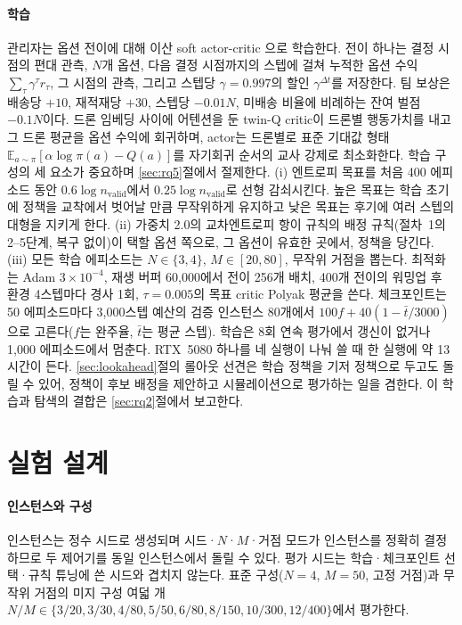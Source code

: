 \documentclass[final,5p,times,twocolumn]{elsarticle}
\begin{document}
\paragraph{학습}
관리자는 옵션 전이에 대해 이산 soft actor-critic \cite{haarnoja2018}으로 학습한다. 전이 하나는
결정 시점의 편대 관측, $N$개 옵션, 다음 결정 시점까지의 스텝에 걸쳐 누적한 옵션 수익
$\sum_{\tau} \gamma^{\tau} r_{\tau}$, 그 시점의 관측, 그리고 스텝당 $\gamma = 0.997$의 할인
$\gamma^{\Delta t}$를 저장한다. 팀 보상은 배송당 $+10$, 재적재당 $+30$, 스텝당 $-0.01N$, 미배송
비율에 비례하는 잔여 벌점 $-0.1N$이다. 드론 임베딩 사이에 어텐션을 둔 twin-Q critic이 드론별
행동가치를 내고 그 드론 평균을 옵션 수익에 회귀하며, actor는 드론별로 표준 기대값 형태
$\mathbb{E}_{a \sim \pi}[\alpha \log \pi(a) - Q(a)]$를 자기회귀 순서의 교사 강제로 최소화한다.
학습 구성의 세 요소가 중요하며 \ref{sec:rq5}절에서 절제한다. (i) 엔트로피 목표를 처음 400 에피소드
동안 $0.6 \log n_{\mathrm{valid}}$에서 $0.25 \log n_{\mathrm{valid}}$로 선형 감쇠시킨다. 높은
목표는 학습 초기에 정책을 교착에서 벗어날 만큼 무작위하게 유지하고 낮은 목표는 후기에 여러 스텝의
대형을 지키게 한다. (ii) 가중치 2.0의 교차엔트로피 항이 규칙의 배정 규칙(절차~1의 2--5단계,
복구 없이)이 택할 옵션 쪽으로, 그 옵션이 유효한 곳에서, 정책을 당긴다. (iii) 모든 학습
에피소드는 $N \in \{3,4\}$, $M \in [20,80]$, 무작위 거점을 뽑는다. 최적화는 Adam
$3 \times 10^{-4}$, 재생 버퍼 60{,}000에서 전이 256개 배치, 400개 전이의 워밍업 후 환경 4스텝마다
경사 1회, $\tau = 0.005$의 목표 critic Polyak 평균을 쓴다. 체크포인트는 50 에피소드마다
3{,}000스텝 예산의 검증 인스턴스 80개에서 $100f + 40(1 - \bar t/3000)$으로 고른다($f$는 완주율, $\bar
t$는 평균 스텝). 학습은 8회 연속 평가에서 갱신이 없거나 1{,}000 에피소드에서 멈춘다. RTX~5080
하나를 네 실행이 나눠 쓸 때 한 실행에 약 13시간이 든다. \ref{sec:lookahead}절의 롤아웃 선견은 학습
정책을 기저 정책으로 두고도 돌릴 수 있어, 정책이 후보 배정을 제안하고 시뮬레이션으로 평가하는 일을
겸한다. 이 학습과 탐색의 결합은 \ref{sec:rq2}절에서 보고한다.

\section{실험 설계}
\label{sec:setup}

\paragraph{인스턴스와 구성}
인스턴스는 정수 시드로 생성되며 시드·$N$·$M$·거점 모드가 인스턴스를 정확히 결정하므로 두 제어기를
동일 인스턴스에서 돌릴 수 있다. 평가 시드는 학습·체크포인트 선택·규칙 튜닝에 쓴 시드와 겹치지
않는다. 표준 구성($N=4$, $M=50$, 고정 거점)과 무작위 거점의 미지 구성 여덟 개
$N/M \in \{3/20, 3/30, 4/80, 5/50, 6/80, 8/150, 10/300, 12/400\}$에서 평가한다.
\end{document}
